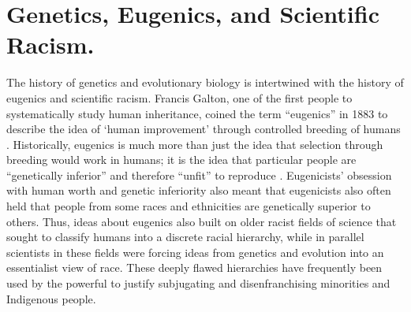 

\section*{Genetics, Eugenics, and Scientific Racism.}
The history of genetics and evolutionary biology is intertwined with the history of eugenics and scientific racism. Francis Galton, one of the first people to systematically study human inheritance, coined the term “eugenics” in 1883 to describe the idea of `human improvement' through controlled breeding of humans \citep{galton1883inquiries}. Historically, eugenics is much more than just the idea that selection through breeding would work in humans; it is the idea that particular people are “genetically inferior” and therefore “unfit” to reproduce \citep{paul2014wrong}.  Eugenicists’ obsession with human worth and genetic inferiority also meant that eugenicists also often held that people from some races and ethnicities are genetically superior to others. Thus, ideas about eugenics also built on older racist fields of science that sought to classify humans into a discrete racial hierarchy, while in parallel scientists in these fields were forcing ideas from genetics and evolution into an essentialist view of race. These deeply flawed hierarchies have frequently been used by the powerful to justify subjugating and disenfranchising minorities and Indigenous people. 

